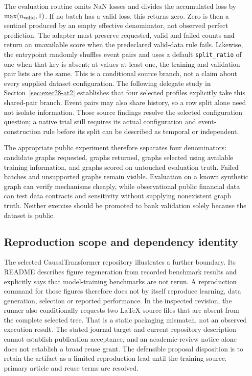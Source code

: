 The evaluation routine omits NaN losses and divides the accumulated loss by
$\max(n_{\rm valid},1)$. If no batch has a valid loss, this returns zero. Zero is then a
sentinel produced by an empty effective denominator, not observed perfect prediction. The adapter
must preserve requested, valid and failed counts and return an unavailable score when the
predeclared valid-data rule fails. Likewise, the entrypoint randomly shuffles event pairs and
uses a default \texttt{split\_ratio} of one when that key is absent; at values at least one,
the training and validation pair lists are the same. This is a conditional source branch,
not a claim about every supplied dataset configuration. The following delegate study in
Section~\ref{sec:exec28-at2} establishes that four selected profiles explicitly take this
shared-pair branch. Event pairs may also share history, so a row split alone need not isolate
information. Those source findings resolve the selected configuration question; a native trial
still requires its actual configuration and event-construction rule before its split can be
described as temporal or independent.
\citep{exec28_at_tacd}

The appropriate public experiment therefore separates four denominators: candidate graphs
requested, graphs returned, graphs selected using available training information, and graphs
scored on untouched evaluation truth. Failed batches and unsupported graphs remain visible.
Evaluation on a known synthetic graph can verify mechanisms cheaply, while observational public
financial data can test data contracts and sensitivity without supplying nonexistent graph truth.
Neither exercise should be promoted to bank validation solely because the dataset is public.

\subsection{Reproduction scope and dependency identity}
The selected CausalTransformer repository illustrates a further boundary. Its README describes
figure regeneration from recorded benchmark results and explicitly says that model-training
benchmarks are not rerun. A reproduction command for those figures therefore does not by itself
reproduce learning, data generation, selection or reported performance. In the inspected revision,
the runner also conditionally requests two LaTeX source files that are absent from the complete
selected tree. That is a static packaging mismatch, not an observed execution result. The stated
journal target and current repository description cannot establish publication acceptance, and
an academic-review notice alone does not establish a broad reuse grant. The defensible proposal
disposition is to retain the artifact as a limited reproduction lead until the training source,
primary article and reuse terms are resolved.~\citep{exec28_at_ct}

